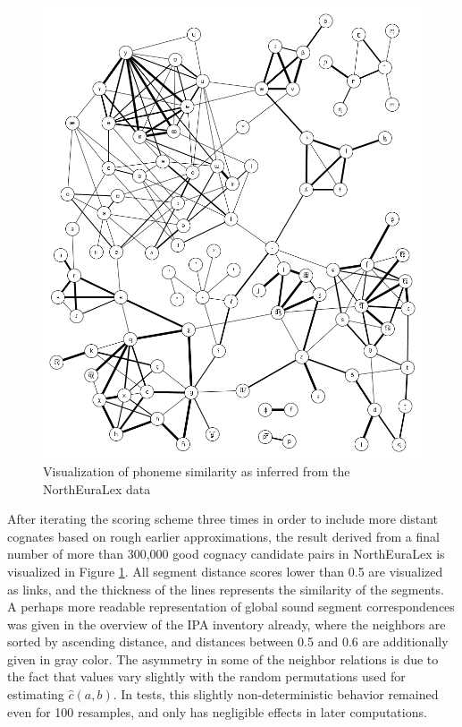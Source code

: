 \begin{figure}[h!]
    \includegraphics[width=\textwidth]{figures/phoneme-neighbor-graph.png}
    \caption{Visualization of phoneme similarity as inferred from the NorthEuraLex data}
    \label{fig:phonemDistGlobal}
\end{figure}

After iterating the scoring scheme three times in order to include more distant cognates based on rough earlier approximations, the result derived from a final number of more than 300,000 good cognacy candidate pairs in NorthEuraLex is visualized in Figure \ref{fig:phonemDistGlobal}. All segment distance scores lower than 0.5 are visualized as links, and the thickness of the lines represents the similarity of the segments. A perhaps more readable representation of global sound segment correspondences was given in the overview of the IPA inventory already, where the neighbors are sorted by ascending distance, and distances between 0.5 and 0.6 are additionally given in gray color. The asymmetry in some of the neighbor relations is due to the fact that values vary slightly with the random permutations used for estimating $\hat{c}(a,b)$. In tests, this slightly non-deterministic behavior remained even for 100 resamples, and only has negligible effects in later computations.

